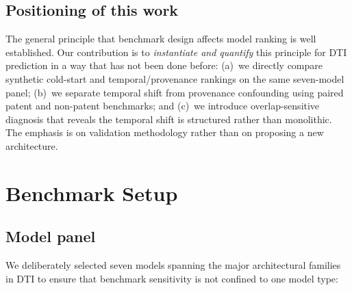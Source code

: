 \documentclass[referee,pdflatex,sn-basic,Numbered]{sn-jnl}
\begin{document}
\subsection{Positioning of this work}

The general principle that benchmark design affects model ranking is well established. Our contribution is to \emph{instantiate and quantify} this principle for DTI prediction in a way that has not been done before: (a)~we directly compare synthetic cold-start and temporal/provenance rankings on the same seven-model panel; (b)~we separate temporal shift from provenance confounding using paired patent and non-patent benchmarks; and (c)~we introduce overlap-sensitive diagnosis that reveals the temporal shift is structured rather than monolithic. The emphasis is on validation methodology rather than on proposing a new architecture.

\section{Benchmark Setup}
\label{sec:setup}

\subsection{Model panel}

We deliberately selected seven models spanning the major architectural families in DTI to ensure that benchmark sensitivity is not confined to one model type:
\end{document}

